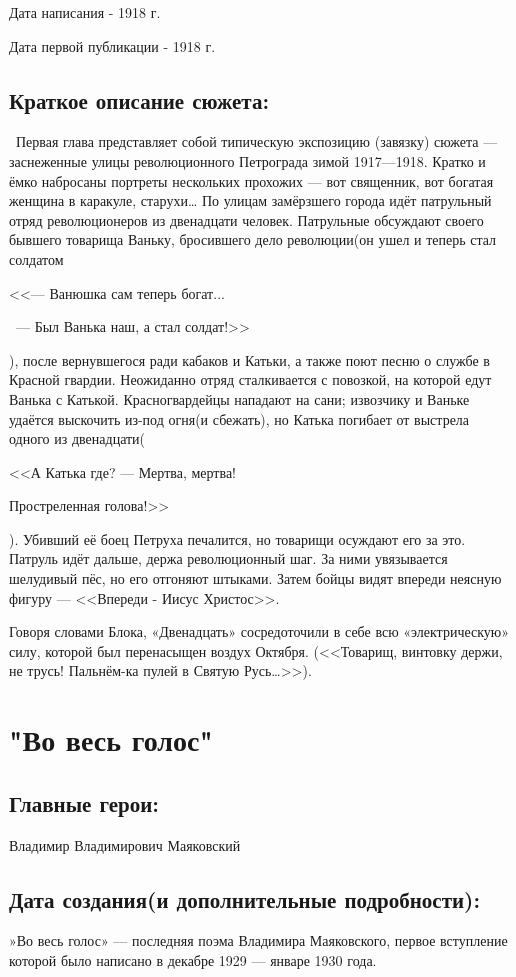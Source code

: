 \documentclass[a4paper,12pt]{article}
\begin{document}
	\noindent
	Дата написания - 1918 г.
	
	\noindent
	Дата первой публикации - 1918 г.
	
	\subsection{Краткое описание сюжета: }
	\quad \, Первая глава представляет собой типическую экспозицию (завязку) сюжета — заснеженные улицы революционного Петрограда зимой 1917—1918. Кратко и ёмко набросаны портреты нескольких прохожих — вот священник, вот богатая женщина в каракуле, старухи… По улицам замёрзшего города идёт патрульный отряд революционеров из двенадцати человек. Патрульные обсуждают своего бывшего товарища Ваньку, бросившего дело революции(он ушел и теперь стал солдатом
	
	<<— Ванюшка сам теперь богат...
	
	\, — Был Ванька наш, а стал солдат!>>
	
	\noindent
	), после вернувшегося ради кабаков и Катьки, а также поют песню о службе в Красной гвардии. Неожиданно отряд сталкивается с повозкой, на которой едут Ванька с Катькой. Красногвардейцы нападают на сани; извозчику и Ваньке удаётся выскочить из-под огня(и сбежать), но Катька погибает от выстрела одного из двенадцати(
	
	<<А Катька где? — Мертва, мертва!
	
	\quad  \quad \quad Простреленная голова!>>
	
	\noindent
	). Убивший её боец Петруха печалится, но товарищи осуждают его за это. Патруль идёт дальше, держа революционный шаг. За ними увязывается шелудивый пёс, но его отгоняют штыками. Затем бойцы видят впереди неясную фигуру — <<Впереди - Иисус Христос>>.
	
	Говоря словами Блока, «Двенадцать» сосредоточили в себе всю «электрическую» силу, которой был перенасыщен воздух Октября. (<<Товарищ, винтовку держи, не трусь! Пальнём-ка пулей в Святую Русь…>>).
	
		\section{"Во весь голос"}
	\subsection{Главные герои: }
	Владимир Владимирович Маяковский
	\subsection{Дата создания(и дополнительные подробности): }
	»Во весь голос» — последняя поэма Владимира Маяковского, первое вступление которой было написано в декабре 1929 — январе 1930 года.
	
\end{document}
